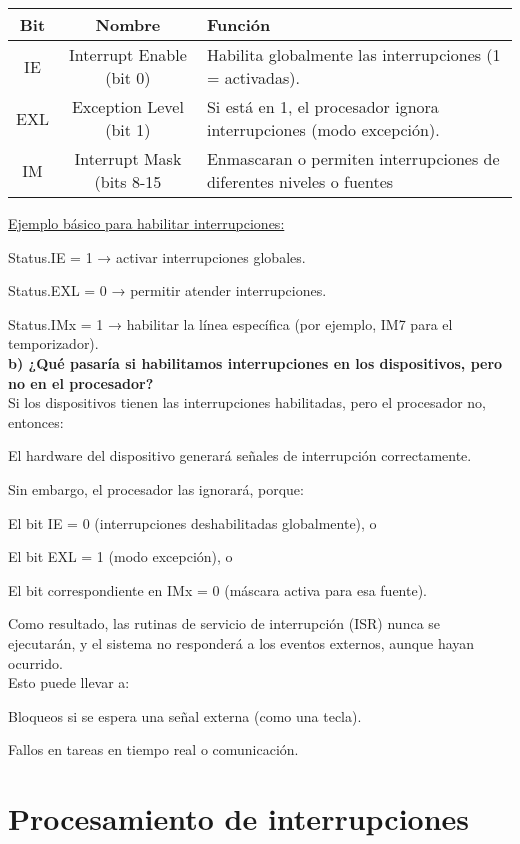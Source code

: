 \documentclass[]{article}
\begin{document}
 \begin{tabular}{|c|c|p{6cm}|}
 	\hline
 	Bit & Nombre & Función \\
 	\hline
 	IE & Interrupt Enable (bit 0) & Habilita globalmente las interrupciones (1 = activadas). \\
 	\hline
 	EXL & Exception Level (bit 1) & Si está en 1, el procesador ignora interrupciones (modo excepción). \\
 	\hline
 	IM & Interrupt Mask (bits 8-15 & Enmascaran o permiten interrupciones de diferentes niveles o fuentes \\
 	\hline
 \end{tabular}

 \underline{Ejemplo básico para habilitar interrupciones:}
 
Status.IE = 1 → activar interrupciones globales.

Status.EXL = 0 → permitir atender interrupciones.

Status.IMx = 1 → habilitar la línea específica (por ejemplo, IM7 para el temporizador). \\

\textbf{b) ¿Qué pasaría si habilitamos interrupciones en los dispositivos, pero no en el procesador?} \\

Si los dispositivos tienen las interrupciones habilitadas, pero el procesador no, entonces:

El hardware del dispositivo generará señales de interrupción correctamente.

Sin embargo, el procesador las ignorará, porque:

El bit IE = 0 (interrupciones deshabilitadas globalmente), o

El bit EXL = 1 (modo excepción), o

El bit correspondiente en IMx = 0 (máscara activa para esa fuente).

Como resultado, las rutinas de servicio de interrupción (ISR) nunca se ejecutarán, y el sistema no responderá a los eventos externos, aunque hayan ocurrido. \\

Esto puede llevar a:

Bloqueos si se espera una señal externa (como una tecla).

Fallos en tareas en tiempo real o comunicación.

\section{Procesamiento de interrupciones}
\end{document}
